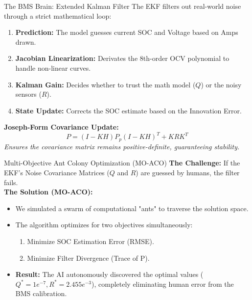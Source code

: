 \documentclass[aspectratio=169]{beamer}
\begin{document}
\begin{frame}{The BMS Brain: Extended Kalman Filter}
    The EKF filters out real-world noise through a strict mathematical loop:
    \begin{enumerate}
        \item \textbf{Prediction:} The model guesses current SOC and Voltage based on Amps drawn.
        \item \textbf{Jacobian Linearization:} Derivates the 8th-order OCV polynomial to handle non-linear curves.
        \item \textbf{Kalman Gain:} Decides whether to trust the math model ($Q$) or the noisy sensors ($R$).
        \item \textbf{State Update:} Corrects the SOC estimate based on the Innovation Error.
    \end{enumerate}
    \vspace{0.2cm}
    \textbf{Joseph-Form Covariance Update:}
    \begin{equation}
        P = (I - KH)P_{p}(I - KH)^T + KRK^T
    \end{equation}
    \textit{Ensures the covariance matrix remains positive-definite, guaranteeing stability.}
\end{frame}

\begin{frame}{Multi-Objective Ant Colony Optimization (MO-ACO)}
    \textbf{The Challenge:} If the EKF's Noise Covariance Matrices ($Q$ and $R$) are guessed by humans, the filter fails. \\
    \vspace{0.3cm}
    \textbf{The Solution (MO-ACO):}
    \begin{itemize}
        \item We simulated a swarm of computational "ants" to traverse the solution space.
        \item The algorithm optimizes for two objectives simultaneously:
        \begin{enumerate}
            \item Minimize SOC Estimation Error (RMSE).
            \item Minimize Filter Divergence (Trace of P).
        \end{enumerate}
        \item \textbf{Result:} The AI autonomously discovered the optimal values ($Q^* = 1e^{-7}, R^* = 2.455e^{-3}$), completely eliminating human error from the BMS calibration.
    \end{itemize}
\end{frame}
\end{document}
